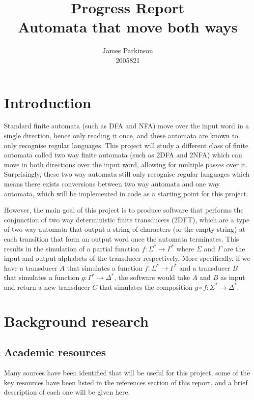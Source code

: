 \documentclass[12pt, a4paper]{article}
\title{Progress Report\\Automata that move both ways}
\author{James Parkinson\\2005821}
\begin{document}
\maketitle

\section{Introduction}

Standard finite automata (such as DFA and NFA) move over the input word in a single direction, hence only reading it once, and these automata are known to only recognise regular languages. This project will study a different class of finite automata called two way finite automata (such as 2DFA and 2NFA) which can move in both directions over the input word, allowing for multiple passes over it. Surprisingly, these two way automata still only recognise regular languages which means there exists conversions between two way automata and one way automata, which will be implemented in code as a starting point for this project.

However, the main goal of this project is to produce software that performs the conjunction of two way deterministic finite transducers (2DFT), which are a type of two way automata that output a string of characters (or the empty string) at each transition that form an output word once the automata terminates. This results in the simulation of a partial function $f:\Sigma^* \rightarrow \Gamma^*$ where $\Sigma$ and $\Gamma$ are the input and output alphabets of the transducer respectively. More specifically, if we have a transducer $A$ that simulates a function $f:\Sigma^* \rightarrow \Gamma^*$ and a transducer $B$ that simulates a function $g:\Gamma^* \rightarrow \Delta^*$, the software would take $A$ and $B$ as input and return a new transducer $C$ that simulates the composition $g \circ f : \Sigma^* \rightarrow \Delta^*$.

\section{Background research}
\subsection{Academic resources}
Many sources have been identified that will be useful for this project, some of the key resources have been listed in the references section of this report, and a brief description of each one will be given here.
\end{document}
